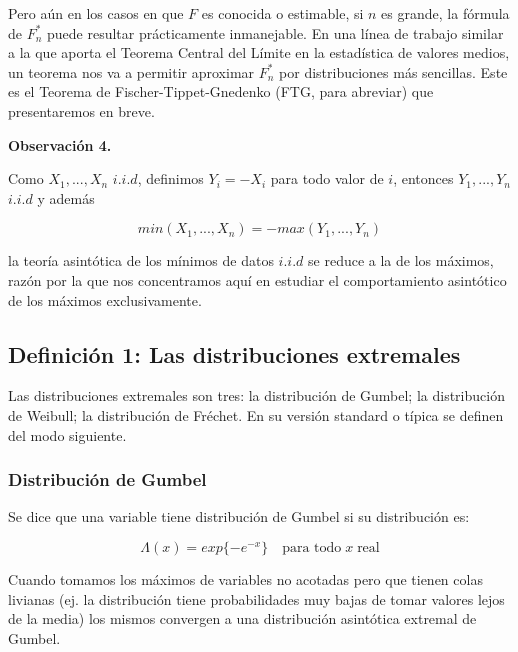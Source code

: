 \documentclass[
  oneside]{book}
\begin{document}
Pero aún en los casos en que \(F\) es conocida o estimable, si \(n\) es
grande, la fórmula de \(F_n^*\) puede resultar prácticamente
inmanejable. En una línea de trabajo similar a la que aporta el Teorema
Central del Límite en la estadística de valores medios, un teorema nos
va a permitir aproximar \(F_n^{*}\) por distribuciones más sencillas.
Este es el Teorema de Fischer-Tippet-Gnedenko (FTG, para abreviar) que
presentaremos en breve.

\textbf{Observación 4.}

Como \(X_1,...,X_n\) \(i.i.d\), definimos \(Y_i = -X_i\) para todo valor
de \(i\), entonces \(Y_1,...,Y_n\) \(i.i.d\) y además

\begin{equation}
min(X_1,...,X_n) = - max(Y_1,...,Y_n)
\end{equation}

la teoría asintótica de los mínimos de datos \(i.i.d\) se reduce a la de
los máximos, razón por la que nos concentramos aquí en estudiar el
comportamiento asintótico de los máximos exclusivamente.

\newpage

\hypertarget{definiciuxf3n-1-las-distribuciones-extremales}{%
\subsection{Definición 1: Las distribuciones
extremales}\label{definiciuxf3n-1-las-distribuciones-extremales}}

Las distribuciones extremales son tres: la distribución de Gumbel; la
distribución de Weibull; la distribución de Fréchet. En su versión
standard o típica se definen del modo siguiente.

\hypertarget{distribuciuxf3n-de-gumbel}{%
\subsubsection{Distribución de Gumbel}\label{distribuciuxf3n-de-gumbel}}

Se dice que una variable tiene distribución de Gumbel si su distribución
es:

\begin{equation}
\Lambda(x) = exp\{-e^{-x}\} \quad\text{para todo}\; x \;\text{real} 
\end{equation}

Cuando tomamos los máximos de variables no acotadas pero que tienen
colas livianas (ej. la distribución tiene probabilidades muy bajas de
tomar valores lejos de la media) los mismos convergen a una distribución
asintótica extremal de Gumbel.
\end{document}
